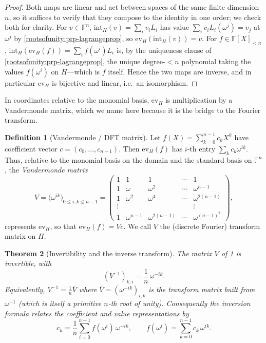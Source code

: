 \documentclass[11pt,a4paper]{article}
\newtheorem{theorem}{Theorem}[section]
\theoremstyle{definition}
\newtheorem{definition}[theorem]{Definition}
\theoremstyle{remark}
\newcommand{\F}{\ensuremath{\mathbb{F}}}
\begin{document}
\begin{proof}
Both maps are linear and act between spaces of the same finite dimension \(n\), so it suffices to verify that they compose to the identity in one order; we check both for clarity. For \(v \in \F^n\), \(\mathrm{int}_H(v) = \sum_i v_i L_i\) has value \(\sum_i v_i L_i(\omega^j) = v_j\) at \(\omega^j\) by \cref{rootsofunity:prp-lagrangeprop}, so \(\mathrm{ev}_H(\mathrm{int}_H(v)) = v\). For \(f \in \F[X]_{<n}\), \(\mathrm{int}_H(\mathrm{ev}_H(f)) = \sum_i f(\omega^i) L_i\) is, by the uniqueness clause of \cref{rootsofunity:prp-lagrangeprop}, the unique degree-\(<n\) polynomial taking the values \(f(\omega^i)\) on \(H\)---which is \(f\) itself. Hence the two maps are inverse, and in particular \(\mathrm{ev}_H\) is bijective and linear, i.e.\ an isomorphism.
\end{proof}

In coordinates relative to the monomial basis, \(\mathrm{ev}_H\) is multiplication by a Vandermonde matrix, which we name here because it is the bridge to the Fourier transform.

\begin{definition}[Vandermonde / DFT matrix]\label{rootsofunity:def-vander}
Let \(f(X) = \sum_{k=0}^{n-1} c_k X^k\) have coefficient vector \(c = (c_0,\dots,c_{n-1})\). Then \(\mathrm{ev}_H(f)\) has \(i\)-th entry \(\sum_{k} c_k \omega^{ik}\). Thus, relative to the monomial basis on the domain and the standard basis on \(\F^n\), the \emph{Vandermonde matrix}
\[
  V = \bigl(\omega^{ik}\bigr)_{0\le i,k \le n-1} =
  \begin{pmatrix}
  1 & 1 & 1 & \cdots & 1\\
  1 & \omega & \omega^2 & \cdots & \omega^{n-1}\\
  1 & \omega^2 & \omega^4 & \cdots & \omega^{2(n-1)}\\
  \vdots & & & & \vdots\\
  1 & \omega^{n-1} & \omega^{2(n-1)} & \cdots & \omega^{(n-1)^2}
  \end{pmatrix},
\]
represents \(\mathrm{ev}_H\), so that \(\mathrm{ev}_H(f) = V c\). We call \(V\) the (discrete Fourier) transform matrix on \(H\).
\end{definition}

\begin{theorem}[Invertibility and the inverse transform]\label{rootsofunity:thm-vanderinv}
The matrix \(V\) of \cref{rootsofunity:def-vander} is invertible, with
\[
  (V^{-1})_{k,i} = \frac{1}{n}\,\omega^{-ik}.
\]
Equivalently, \(V^{-1} = \tfrac1n \overline V\) where \(\overline V = (\omega^{-ik})_{i,k}\) is the transform matrix built from \(\omega^{-1}\) (which is itself a primitive \(n\)-th root of unity). Consequently the inversion formula relates the coefficient and value representations by
\[
  c_k = \frac1n \sum_{i=0}^{n-1} f(\omega^i)\,\omega^{-ik}, \qquad
  f(\omega^i) = \sum_{k=0}^{n-1} c_k\,\omega^{ik}.
\]
\end{theorem}
\end{document}
